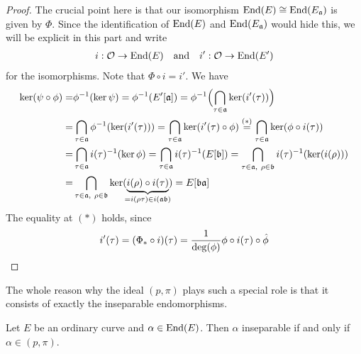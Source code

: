 \begin{proof}
    The crucial point here is that our isomorphism $\mathrm{End}(E) \cong \mathrm{End}(E_{\mathfrak{a}})$ is given by $\Phi$.
    Since the identification of $\mathrm{End}(E)$ and $\mathrm{End}(E_{\mathfrak{a}})$ would hide this, we will be explicit in this part and write
    \begin{align*}
        i: \mathcal{O} \to \mathrm{End}(E) \quad \text{and} \quad i': \mathcal{O} \to \mathrm{End}(E')
    \end{align*}
    for the isomorphisms.
    Note that $\Phi \circ i = i'$.
    We have
    \begin{align*}
        \ker(\psi \circ \phi) =& \phi^{-1}(\ker\psi) = \phi^{-1}(E'[\mathfrak{a}]) = \phi^{-1}\Bigl( \bigcap_{\tau \in \mathfrak{a}} \ker(i'(\tau)) \Bigr) \\
        =& \bigcap_{\tau \in \mathfrak{a}} \phi^{-1}(\ker(i'(\tau))) = \bigcap_{\tau \in \mathfrak{a}} \ker(i'(\tau) \circ \phi) \overset{(*)}{=} \bigcap_{\tau \in \mathfrak{a}} \ker(\phi \circ i(\tau)) \\
        =& \bigcap_{\tau \in \mathfrak{a}} i(\tau)^{-1}(\ker\phi) = \bigcap_{\tau \in \mathfrak{a}} i(\tau)^{-1}(E[\mathfrak{b}]) = \bigcap_{\tau \in \mathfrak{a}, \ \rho \in \mathfrak{b}} i(\tau)^{-1}(\ker(i(\rho))) \\
        =& \bigcap_{\tau \in \mathfrak{a}, \ \rho \in \mathfrak{b}} \ker(\underbrace{i(\rho) \circ i(\tau)}_{\mathclap{= i(\rho\tau) \in i(\a\b)}}) = E[\mathfrak{b}\mathfrak{a}]
    \end{align*}
    The equality at $(*)$ holds, since
    \begin{equation*}
        i'(\tau) = (\Phi_* \circ i)(\tau) = \frac 1 {\deg(\phi)} \phi \circ i(\tau) \circ \hat{\phi} \qedhere
    \end{equation*}
\end{proof}
The whole reason why the ideal $(p, \pi)$ plays such a special role is that it consists of exactly the inseparable endomorphisms.
\begin{lemma}
    \label{prop:inseparable_iff_frobenius_ideal}
    Let $E$ be an ordinary curve and $\alpha \in \mathrm{End}(E)$.
    Then $\alpha$ inseparable if and only if $\alpha \in (p, \pi)$.
\end{lemma}
